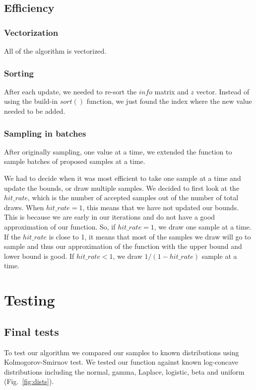 \documentclass{article}\usepackage[]{graphicx}\usepackage[]{color}
\begin{document}
\subsection{Efficiency}

\subsubsection{Vectorization}
All of the algorithm is vectorized. 

\subsubsection{Sorting}
After each update, we needed to re-sort the $info$ matrix and $z$
vector. Instead of using the build-in $sort()$ function, we just found
the index where the new value needed to be added.

\subsubsection{Sampling in batches}
After originally sampling, one value at a time, we extended the
function to sample batches of proposed samples at a time.

We had to decide when it was most efficient to take one sample at a
time and update the bounds, or draw multiple samples. We decided to
first look at the $hit\_rate$, which is the number of accepted samples
out of the number of total draws. When $hit\_rate=1$, this means that
we have not updated our bounds. This is because we are early in our
iterations and do not have a good approximation of our function. So,
if $hit\_rate=1$, we draw one sample at a time. If the $hit\_rate$ is
close to 1, it means that most of the samples we draw will go to
sample and thus our approximation of the function with the upper bound
and lower bound is good. If $hit\_rate < 1$, we draw $1/(1 - hit\_rate)$
sample at a time.

\section{Testing}

\subsection{Final tests} To test our algorithm we compared our samples
to known distributions using Kolmogorov-Smirnov test. We tested our
function against known log-concave distributions including the normal,
gamma, Laplace, logistic, beta and uniform (Fig.~\ref{fig:dists}).
\end{document}
